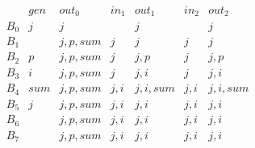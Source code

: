 \documentclass[11pt]{homework}
\begin{document}
\begin{enumerate}[label=(\alph*)]
\newcommand{\EMP}{\emptyset}
$$
\begin{array}{l||l|l||l|l||l|l}
	    & gen & out_0     & in_1 & out_1     & in_2 & out_2     \\
	B_0 & j   & j         &      & j         &      & j         \\
	B_1 &     & j, p, sum & j    & j         & j    & j         \\
	B_2 & p   & j, p, sum & j    & j, p      & j    & j, p      \\
	B_3 & i   & j, p, sum & j    & j, i      & j    & j, i      \\
	B_4 & sum & j, p, sum & j, i & j, i, sum & j, i & j, i, sum \\
	B_5 & j   & j, p, sum & j, i & j, i      & j, i & j, i      \\
	B_6 &     & j, p, sum & j, i & j, i      & j, i & j, i      \\
	B_7 &     & j, p, sum & j, i & j, i      & j, i & j, i
\end{array}
$$
\end{enumerate}
\end{document}
